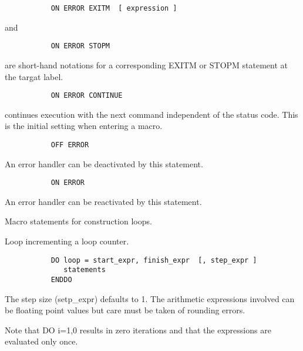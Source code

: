 \begin{verbatim}
           ON ERROR EXITM  [ expression ]
\end{verbatim}
   \par
and 
\begin{verbatim}
           ON ERROR STOPM
\end{verbatim}
\ENDVERB
   \par
are short-hand notations for a corresponding EXITM or STOPM statement at 
   the targat label.  

\begin{verbatim}
           ON ERROR CONTINUE
\end{verbatim}
\ENDVERB
   \par
continues execution with the next command independent of the status code.  
   This is the initial setting when entering a macro.  

\begin{verbatim}
           OFF ERROR
\end{verbatim}
\ENDVERB
   \par
An error handler can be deactivated by this statement.  

\begin{verbatim}
           ON ERROR
\end{verbatim}
\ENDVERB
   \par
An error handler can be reactivated by this statement.  

\ENDCMD
{}
\ifMENUtext
   \par
Macro statements for construction loops.  


\fi


   \par
Loop incrementing a loop counter.  

\begin{verbatim}
           DO loop = start_expr, finish_expr  [, step_expr ]
              statements
           ENDDO
\end{verbatim}
\ENDVERB
   \par
The step size (setp_expr) defaults to \DQUOTE{}1\DQUOTE{}. The arithmetic 
   expressions involved can be floating point values but care must be taken of 
   rounding errors.  

   \par
Note that \DQUOTE{}DO i=1,0\DQUOTE{} results in zero iterations and that 
   the expressions are evaluated only once.  

